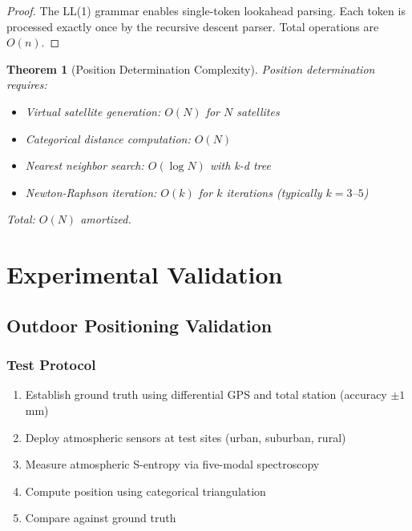 \documentclass[twocolumn,10pt,a4paper]{article}
\newtheorem{theorem}{Theorem}[section]
\theoremstyle{definition}
\theoremstyle{remark}
\begin{document}
\begin{proof}
The LL(1) grammar enables single-token lookahead parsing. Each token is processed exactly once by the recursive descent parser. Total operations are $O(n)$.
\end{proof}

\begin{theorem}[Position Determination Complexity]
\label{thm:pos_complexity}
Position determination requires:
\begin{itemize}
    \item Virtual satellite generation: $O(N)$ for $N$ satellites
    \item Categorical distance computation: $O(N)$
    \item Nearest neighbor search: $O(\log N)$ with k-d tree
    \item Newton-Raphson iteration: $O(k)$ for $k$ iterations (typically $k = 3$--$5$)
\end{itemize}
Total: $O(N)$ amortized.
\end{theorem}

\section{Experimental Validation}
\label{sec:validation}

\subsection{Outdoor Positioning Validation}

\subsubsection{Test Protocol}

\begin{enumerate}
    \item Establish ground truth using differential GPS and total station (accuracy $\pm 1$ mm)
    \item Deploy atmospheric sensors at test sites (urban, suburban, rural)
    \item Measure atmospheric S-entropy via five-modal spectroscopy
    \item Compute position using categorical triangulation
    \item Compare against ground truth
\end{enumerate}
\end{document}
